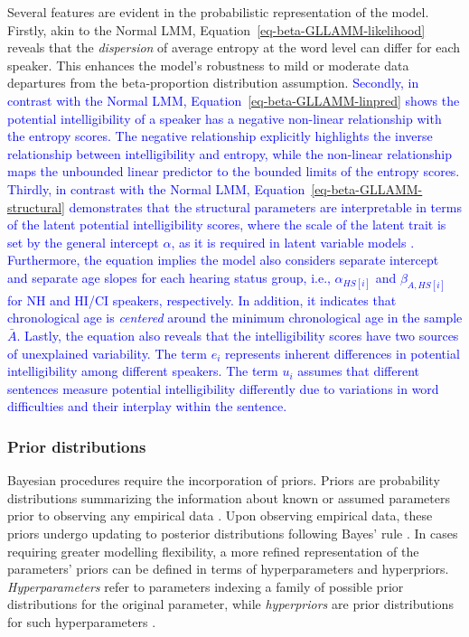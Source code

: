 \documentclass[
  authoryear,
  preprint,
  1p]{elsarticle}
\begin{document}
Several features are evident in the probabilistic representation of the
model. Firstly, akin to the Normal LMM,
Equation~\ref{eq-beta-GLLAMM-likelihood} reveals that the
\emph{dispersion} of average entropy at the word level can differ for
each speaker. This enhances the model's robustness to mild or moderate
data departures from the beta-proportion distribution assumption.
\textcolor{blue}{Secondly, in contrast with the Normal LMM,
Equation~\ref{eq-beta-GLLAMM-linpred} shows the potential
intelligibility of a speaker has a negative non-linear relationship with
the entropy scores. The negative relationship explicitly highlights the
inverse relationship between intelligibility and entropy, while the
non-linear relationship maps the unbounded linear predictor to the
bounded limits of the entropy scores. Thirdly, in contrast with the
Normal LMM, Equation~\ref{eq-beta-GLLAMM-structural} demonstrates that
the structural parameters are interpretable in terms of the latent
potential intelligibility scores, where the scale of the latent trait is
set by the general intercept \(\alpha\), as it is required in latent
variable models \citep{Depaoli_2021}. Furthermore, the equation implies
the model also considers separate intercept and separate age slopes for
each hearing status group, i.e., \(\alpha_{HS[i]}\) and
\(\beta_{A, HS[i]}\) for NH and HI/CI speakers, respectively. In
addition, it indicates that chronological age is \emph{centered} around
the minimum chronological age in the sample \(\bar{A}\). Lastly, the
equation also reveals that the intelligibility scores have two sources
of unexplained variability. The term \(e_{i}\) represents inherent
differences in potential intelligibility among different speakers. The
term \(u_{i}\) assumes that different sentences measure potential
intelligibility differently due to variations in word difficulties and
their interplay within the sentence.}

\subsubsection{Prior distributions}\label{sec-M-SM-P}

Bayesian procedures require the incorporation of priors. Priors are
probability distributions summarizing the information about known or
assumed parameters prior to observing any empirical data
\citep{Everitt_et_al_2010}. Upon observing empirical data, these priors
undergo updating to posterior distributions following Bayes' rule
\citep{Jeffreys_1998}. In cases requiring greater modelling flexibility,
a more refined representation of the parameters' priors can be defined
in terms of hyperparameters and hyperpriors. \emph{Hyperparameters}
refer to parameters indexing a family of possible prior distributions
for the original parameter, while \emph{hyperpriors} are prior
distributions for such hyperparameters \citep{Everitt_et_al_2010}.
\end{document}
